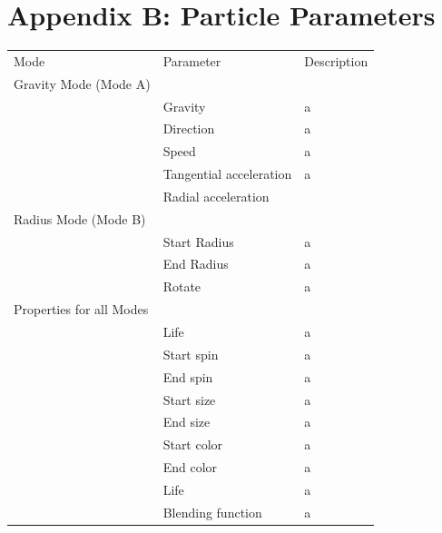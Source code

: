 \documentclass{scrreprt}
\begin{document}
\chapter{Appendix B: Particle Parameters}
\begin{table}
    \begin{tabular}{lll}
    Mode                     & Parameter               & Description \\
    Gravity Mode (Mode A)    & ~                       & ~           \\ \hline
    ~                        & Gravity                 & a           \\
    ~                        & Direction               & a           \\
    ~                        & Speed                   & a           \\
    ~                        & Tangential acceleration & a           \\
    ~                        & Radial acceleration     & ~           \\
    Radius Mode (Mode B)     & ~                       & ~           \\
    ~                        & Start Radius            & a           \\
    ~                        & End Radius              & a           \\
    ~                        & Rotate                  & a           \\
    Properties for all Modes & ~                       & ~           \\
    ~                        & Life                    & a           \\
    ~                        & Start spin              & a           \\
    ~                        & End spin                & a           \\
    ~                        & Start size              & a           \\
    ~                        & End size                & a           \\
    ~                        & Start color             & a           \\
    ~                        & End color               & a           \\
    ~                        & Life                    & a           \\
    ~                        & Blending function       & a           \\
    \end{tabular}
\end{table}
\end{document}
